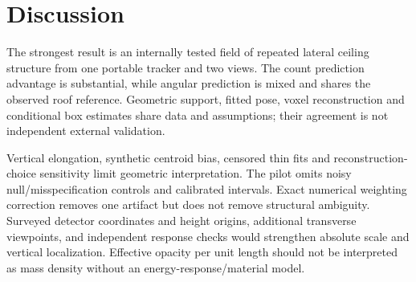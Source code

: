 \section{Discussion}\label{sec:discussion}
The strongest result is an internally tested field of repeated lateral ceiling structure from one portable tracker and two views. The count prediction advantage is substantial, while angular prediction is mixed and shares the observed roof reference. Geometric support, fitted pose, voxel reconstruction and conditional box estimates share data and assumptions; their agreement is not independent external validation.

Vertical elongation, synthetic centroid bias, censored thin fits and reconstruction-choice sensitivity limit geometric interpretation. The pilot omits noisy null/misspecification controls and calibrated intervals. Exact numerical weighting correction removes one artifact but does not remove structural ambiguity. Surveyed detector coordinates and height origins, additional transverse viewpoints, and independent response checks would strengthen absolute scale and vertical localization. Effective opacity per unit length should not be interpreted as mass density without an energy-response/material model.

